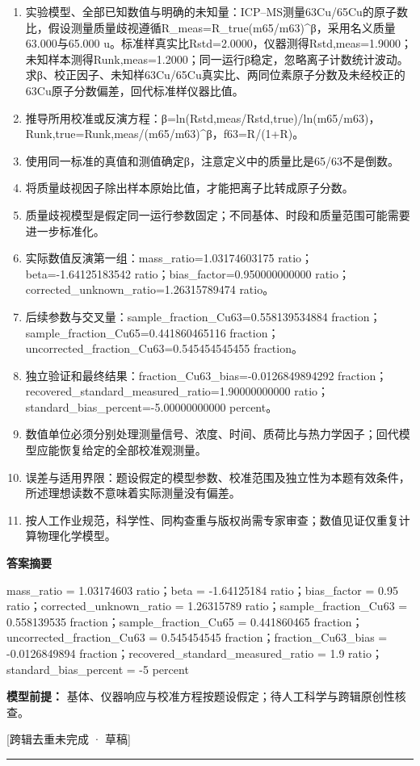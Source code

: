 \documentclass[UTF8,11pt,a4paper]{ctexart}
\begin{document}
\begin{enumerate}
\item 实验模型、全部已知数值与明确的未知量：ICP–MS测量63Cu/65Cu的原子数比，假设测量质量歧视遵循R\_meas=R\_true(m65/m63)\textasciicircum{}β，采用名义质量63.000与65.000 u。标准样真实比Rstd=2.0000，仪器测得Rstd,meas=1.9000；未知样本测得Runk,meas=1.2000；同一运行β稳定，忽略离子计数统计波动。求β、校正因子、未知样63Cu/65Cu真实比、两同位素原子分数及未经校正的63Cu原子分数偏差，回代标准样仪器比值。
\item 推导所用校准或反演方程：β=ln(Rstd,meas/Rstd,true)/ln(m65/m63)，Runk,true=Runk,meas/(m65/m63)\textasciicircum{}β，f63=R/(1+R)。
\item 使用同一标准的真值和测值确定β，注意定义中的质量比是65/63不是倒数。
\item 将质量歧视因子除出样本原始比值，才能把离子比转成原子分数。
\item 质量歧视模型是假定同一运行参数固定；不同基体、时段和质量范围可能需要进一步标准化。
\item 实际数值反演第一组：mass\_ratio=1.03174603175 ratio；beta=-1.64125183542 ratio；bias\_factor=0.950000000000 ratio；corrected\_unknown\_ratio=1.26315789474 ratio。
\item 后续参数与交叉量：sample\_fraction\_Cu63=0.558139534884 fraction；sample\_fraction\_Cu65=0.441860465116 fraction；uncorrected\_fraction\_Cu63=0.545454545455 fraction。
\item 独立验证和最终结果：fraction\_Cu63\_bias=-0.0126849894292 fraction；recovered\_standard\_measured\_ratio=1.90000000000 ratio；standard\_bias\_percent=-5.00000000000 percent。
\item 数值单位必须分别处理测量信号、浓度、时间、质荷比与热力学因子；回代模型应能恢复给定的全部校准观测量。
\item 误差与适用界限：题设假定的模型参数、校准范围及独立性为本题有效条件，所述理想读数不意味着实际测量没有偏差。
\item 按人工作业规范，科学性、同构查重与版权尚需专家审查；数值见证仅重复计算物理化学模型。
\end{enumerate}
\noindent\textbf{答案摘要}\par
mass\_ratio = 1.03174603 ratio；beta = -1.64125184 ratio；bias\_factor = 0.95 ratio；corrected\_unknown\_ratio = 1.26315789 ratio；sample\_fraction\_Cu63 = 0.558139535 fraction；sample\_fraction\_Cu65 = 0.441860465 fraction；uncorrected\_fraction\_Cu63 = 0.545454545 fraction；fraction\_Cu63\_bias = -0.0126849894 fraction；recovered\_standard\_measured\_ratio = 1.9 ratio；standard\_bias\_percent = -5 percent\par
\noindent\textbf{模型前提：}
基体、仪器响应与校准方程按题设假定；待人工科学与跨辑原创性核查。\par
\noindent\textcolor{red!65!black}{[跨辑去重未完成 · 草稿]} \par
\medskip\hrule\medskip
{}
\end{document}
